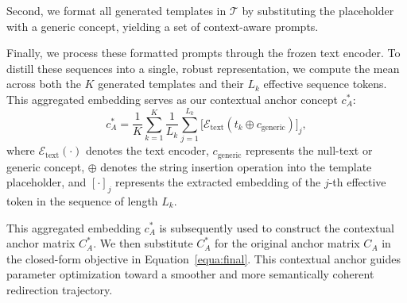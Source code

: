 \documentclass[letterpaper]{article} %
\begin{document}
Second, we format all generated templates in $\mathcal{T}$ by substituting the placeholder with a generic concept, yielding a set of context-aware prompts. 

Finally, we process these formatted prompts through the frozen text encoder. To distill these sequences into a single, robust representation, we compute the mean across both the $K$ generated templates and their $L_k$ effective sequence tokens. This aggregated embedding serves as our contextual anchor concept $c_{A}^*$:
\begin{equation}
    c_{A}^* = \frac{1}{K} \sum_{k=1}^K \frac{1}{L_k} \sum_{j=1}^{L_k} \big[\mathcal{E}_{\text{text}}(t_k \oplus c_{\text{generic}})\big]_j ,
\end{equation}
where $\mathcal{E}_{\text{text}}(\cdot)$ denotes the text encoder, $c_{\text{generic}}$ represents the null-text or generic concept, $\oplus$ denotes the string insertion operation into the template placeholder, and $[\cdot]_j$ represents the extracted embedding of the $j$-th effective token in the sequence of length $L_k$.

This aggregated embedding $c_A^*$ is subsequently used to construct the contextual anchor matrix $C_A^*$. We then substitute $C_A^*$ for the original anchor matrix $C_A$ in the closed-form objective in Equation~\eqref{equa:final}. This contextual anchor guides parameter optimization toward a smoother and more semantically coherent redirection trajectory.
\end{document}
